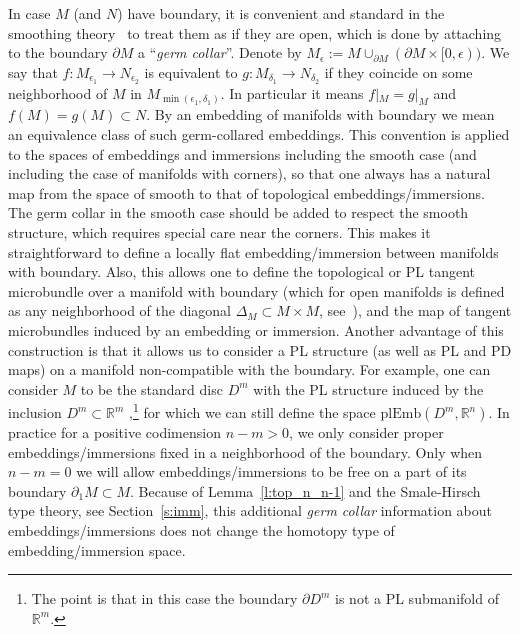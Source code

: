 \documentclass[11pt]{amsart}
\theoremstyle{definition}
\newcommand{\R}{{\mathbb R}}
\newcommand{\plEmb}{\mathrm{plEmb}}
\numberwithin{equation}{section}
\begin{document}
In case $M$ (and $N$) have boundary, it is convenient and standard in the smoothing theory~\cite{BL_diff} to treat them as if they are open, which is done by attaching to the boundary $\partial M$
a ``{\it germ collar}''. Denote by $M_\epsilon:=M\cup_{\partial M} (\partial M\times [0,\epsilon))$. We say that $f\colon M_{\epsilon_1} \to N_{\epsilon_2}$ is equivalent
to $g\colon M_{\delta_1} \to N_{\delta_2}$ if they coincide on some neighborhood of $M$ in $M_{\min(\epsilon_1,\delta_1)}$. In particular it means $f|_M=g|_M$ and 
$f(M)=g(M)\subset N$. By an embedding of manifolds with boundary we mean an equivalence class of such germ-collared embeddings. This convention is applied to the spaces of embeddings and immersions including the smooth case (and including the case of manifolds with corners), so that one always has a natural map from the space of smooth to that of topological 
embeddings/immersions.  The germ collar in the smooth case should be added   to respect the smooth structure, which requires special care near the corners.
 This makes it straightforward to define a locally flat embedding/immersion between manifolds with boundary. Also, this allows one to define the topological or PL tangent 
microbundle over a manifold with boundary (which for open manifolds is defined as any neighborhood of the diagonal $\Delta_M\subset M\times M$, see~\cite{Milnor}), and the 
map of tangent microbundles induced by an embedding or immersion.  Another advantage of this construction is that it allows us to consider a  PL structure (as well as PL and PD maps) on a manifold non-compatible with the boundary. %
 For example, one can consider $M$ to be the standard disc $D^m$ with the PL structure induced
by the inclusion $D^m\subset \R^m$ ,\footnote{The point is that in this case the boundary $\partial D^m$ is not a PL submanifold of $\R^m$.} for which we can still define the space $\plEmb(D^m,\R^n)$. In practice for a positive codimension $n-m>0$, we only consider proper embeddings/immersions fixed in 
a neighborhood of the boundary. Only when $n-m=0$ we will allow embeddings/immersions to be free on a part of its boundary $\partial_1M\subset M$. Because of Lemma~\ref{l:top_n_n-1} and the Smale-Hirsch type theory, see Section~\ref{s:imm}, this additional {\it germ collar} information about embeddings/immersions does not change the homotopy type 
of embedding/immersion space.
\end{document}
